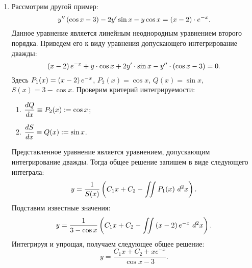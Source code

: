 \begin{enumerate}
			\item Рассмотрим другой пример:
				\[ y'' \left( \cos{x} - 3 \right) - 2y' \sin{x} - y \cos{x} = \left( x - 2 \right) \cdot e^{-x}. \]
				Данное уравнение является линейным неоднородным уравнением второго порядка. Приведем его к виду уравнения допускающего интегрирование дважды:
				\[ \left( x - 2 \right) e^{-x} + y \cdot \cos{x} + 2y' \cdot \sin{x} - y'' \cdot \left( \cos{x} - 3 \right) = 0. \]
				Здесь $P_1(x) = \left( x - 2 \right) e^{-x}$, $P_2(x) = \cos{x}$, $Q(x) = \sin{x}$, $S(x) = 3 - \cos{x}$. Проверим критерий интегрируемости:
				\begin{enumerate}
					\item \( \dfrac{d Q}{d x} \equiv P_2(x) := \cos{x} \);
					\item \( \dfrac{d S}{d x} \equiv Q(x) := \sin{x} \).
				\end{enumerate}
				Представленное уравнение является уравнением, допускающим интегрирование дважды. Тогда общее решение запишем в виде следующего интеграла:
				\[ y = \frac{1}{S(x)} \left( C_1 x + C_2 - \iint P_1(x) ~ d^2 x \right). \]
				Подставим известные значения:
				\[ y = \frac{1}{3 - \cos{x}} \left( C_1 x + C_2 - \iint \left( x - 2 \right) e^{-x} ~ d^2 x \right). \]
				Интегрируя и упрощая, получаем следующее общее решение:
				\[ y = \frac{C_1x + C_2 + xe^{-x}}{\cos{x} - 3}. \]
		
		\end{enumerate}
